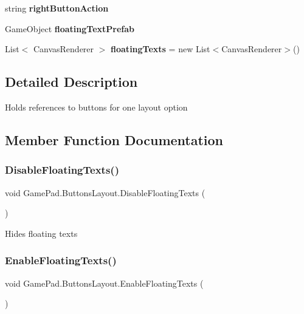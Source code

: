 \begin{DoxyCompactItemize}
string {\bfseries right\+Button\+Action}
\item 
\mbox{\label{class_game_pad_1_1_buttons_layout_a1df1fad919ccf7c8c775473921267095}} 
Game\+Object {\bfseries floating\+Text\+Prefab}
\item 
\mbox{\label{class_game_pad_1_1_buttons_layout_a3815e748c5a1c82d4f6cb4499bc37e92}} 
List$<$ Canvas\+Renderer $>$ {\bfseries floating\+Texts} = new List$<$Canvas\+Renderer$>$()
\end{DoxyCompactItemize}


\subsection{Detailed Description}
Holds references to buttons for one layout option 



\subsection{Member Function Documentation}
\mbox{\label{class_game_pad_1_1_buttons_layout_a5fa09be50f3e6c30e8b2646fbb2b6b9a}} 
\subsubsection{\texorpdfstring{DisableFloatingTexts()}{DisableFloatingTexts()}}
{\footnotesize\ttfamily void Game\+Pad.\+Buttons\+Layout.\+Disable\+Floating\+Texts (\begin{DoxyParamCaption}{ }\end{DoxyParamCaption})}



Hides floating texts 

\mbox{\label{class_game_pad_1_1_buttons_layout_a607219842136259c53d4e70f1cb52c9d}} 
\subsubsection{\texorpdfstring{EnableFloatingTexts()}{EnableFloatingTexts()}}
{\footnotesize\ttfamily void Game\+Pad.\+Buttons\+Layout.\+Enable\+Floating\+Texts (\begin{DoxyParamCaption}{ }\end{DoxyParamCaption})}



